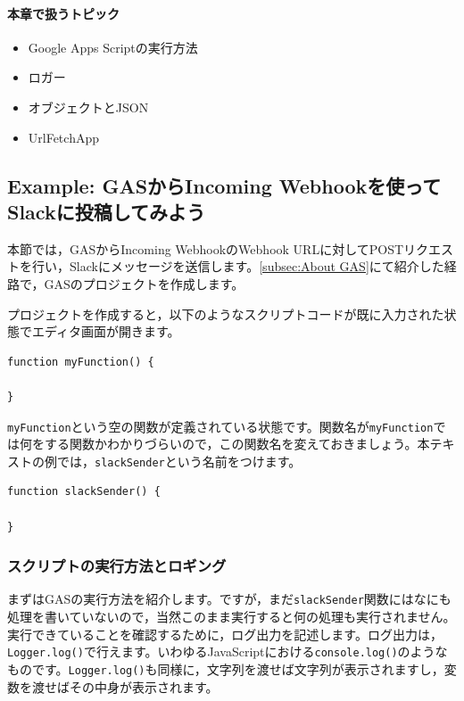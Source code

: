 \documentclass[uplatex,a4j]{jsarticle}
\begin{document}
\paragraph{本章で扱うトピック}
\begin{itemize}
\item Google Apps Scriptの実行方法
\item ロガー
\item オブジェクトとJSON
\item UrlFetchApp
\end{itemize}

\subsection{Example: GASからIncoming Webhookを使ってSlackに投稿してみよう}

本節では，GASからIncoming WebhookのWebhook URLに対してPOSTリクエストを行い，Slackにメッセージを送信します。\ref{subsec:About GAS}にて紹介した経路で，GASのプロジェクトを作成します。

プロジェクトを作成すると，以下のようなスクリプトコードが既に入力された状態でエディタ画面が開きます。

\begin{lstlisting}[basicstyle=\ttfamily\footnotesize,frame=single,caption=Default Script]
function myFunction() {

}
\end{lstlisting}

\verb|myFunction|という空の関数が定義されている状態です。関数名が\verb|myFunction|では何をする関数かわかりづらいので，この関数名を変えておきましょう。本テキストの例では，\verb|slackSender|という名前をつけます。

\begin{lstlisting}[basicstyle=\ttfamily\footnotesize,frame=single,caption=Change function name]
function slackSender() {

}
\end{lstlisting}

\subsubsection{スクリプトの実行方法とロギング}

まずはGASの実行方法を紹介します。ですが，まだ\verb|slackSender|関数にはなにも処理を書いていないので，当然このまま実行すると何の処理も実行されません。実行できていることを確認するために，ログ出力を記述します。ログ出力は，\verb|Logger.log()|で行えます。いわゆるJavaScriptにおける\verb|console.log()|のようなものです。\verb|Logger.log()|も同様に，文字列を渡せば文字列が表示されますし，変数を渡せばその中身が表示されます。
\end{document}
